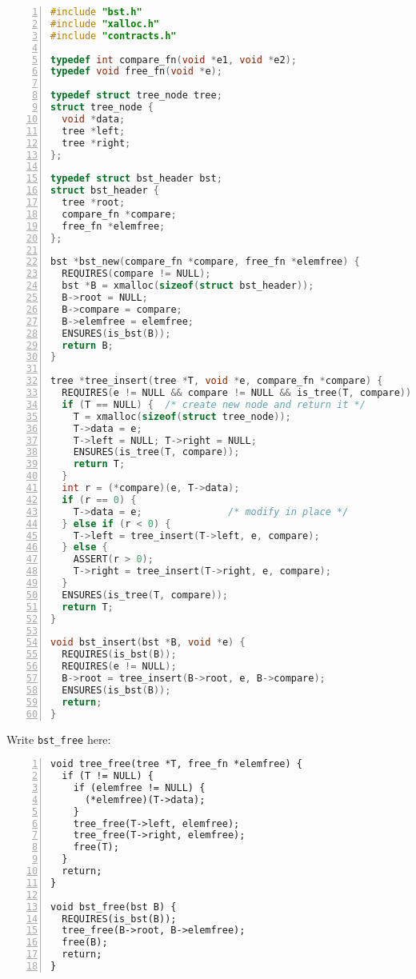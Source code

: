 \begin{solution}
\begin{lstlisting}[numbers=left, language=C]
#include "bst.h"
#include "xalloc.h"
#include "contracts.h"

typedef int compare_fn(void *e1, void *e2);
typedef void free_fn(void *e);

typedef struct tree_node tree;
struct tree_node {
  void *data;
  tree *left;
  tree *right;
};

typedef struct bst_header bst;
struct bst_header {
  tree *root;
  compare_fn *compare;
  free_fn *elemfree;
};

bst *bst_new(compare_fn *compare, free_fn *elemfree) {
  REQUIRES(compare != NULL);
  bst *B = xmalloc(sizeof(struct bst_header));
  B->root = NULL;
  B->compare = compare;
  B->elemfree = elemfree;
  ENSURES(is_bst(B));
  return B;
}

tree *tree_insert(tree *T, void *e, compare_fn *compare) {
  REQUIRES(e != NULL && compare != NULL && is_tree(T, compare));
  if (T == NULL) {  /* create new node and return it */
    T = xmalloc(sizeof(struct tree_node));
    T->data = e;
    T->left = NULL; T->right = NULL;
    ENSURES(is_tree(T, compare));
    return T;
  }
  int r = (*compare)(e, T->data);
  if (r == 0) {
    T->data = e;               /* modify in place */
  } else if (r < 0) {
    T->left = tree_insert(T->left, e, compare);
  } else {
    ASSERT(r > 0);
    T->right = tree_insert(T->right, e, compare);
  }
  ENSURES(is_tree(T, compare));
  return T;
}

void bst_insert(bst *B, void *e) {
  REQUIRES(is_bst(B));
  REQUIRES(e != NULL);
  B->root = tree_insert(B->root, e, B->compare);
  ENSURES(is_bst(B));
  return;
}
\end{lstlisting}
\end{solution}

Write \lstinline[language=C]'bst_free' here:
\begin{solution}
\begin{lstlisting}[numbers=left]
void tree_free(tree *T, free_fn *elemfree) {
  if (T != NULL) {
    if (elemfree != NULL) {
      (*elemfree)(T->data);
    }
    tree_free(T->left, elemfree);
    tree_free(T->right, elemfree);
    free(T);
  }
  return;
}

void bst_free(bst B) {
  REQUIRES(is_bst(B));
  tree_free(B->root, B->elemfree);
  free(B);
  return;
}
\end{lstlisting}
\end{solution}
\egroup
